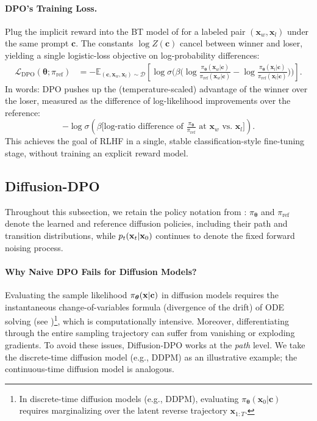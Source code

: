 \paragraph{DPO's Training Loss.}
Plug the implicit reward  into the BT model of  for a labeled pair $(\mathbf x_w,\mathbf x_l)$ under the same prompt $\mathbf c$. 
The constants $\log Z(\mathbf c)$ cancel between winner and loser, yielding a single logistic-loss objective on log-probability differences:
\begin{align*}
\mathcal L_{\mathrm{DPO}}(\bm\theta;\pi_{\mathrm{ref}})
&=
-\mathbb E_{(\mathbf c,\mathbf x_w,\mathbf x_l)\sim\mathcal D} \left[
\log \sigma \Big(
\beta\big(
\log\frac{\pi_{\bm\theta}(\mathbf x_w|\mathbf c)}{\pi_{\mathrm{ref}}(\mathbf x_w|\mathbf c)}
-
\log\frac{\pi_{\bm\theta}(\mathbf x_l|\mathbf c)}{\pi_{\mathrm{ref}}(\mathbf x_l|\mathbf c)}
\big)
\Big)
\right].
\end{align*}
In words: DPO pushes up the (temperature-scaled) advantage of the winner over the loser, measured as the difference of log-likelihood improvements over the reference:
\[
-\log \sigma \left(
  \beta 
  \bigl[
    \text{log-ratio difference of }
    \tfrac{\pi_{\bm\theta}}{\pi_{\mathrm{ref}}}
    \text{ at } \mathbf x_w \text{ vs.\ } \mathbf x_l
  \bigr]
\right).
\]
This achieves the goal of RLHF in a single, stable classification-style
fine-tuning stage, without training an explicit reward model.


\subsection{Diffusion-DPO}\label{subsec:diffusion-dpo}
Throughout this subsection, we retain the policy notation from
: $\pi_{\bm\theta}$ and $\pi_{\mathrm{ref}}$ denote the
learned and reference diffusion policies, including their path and transition
distributions, while $p_t({\mathbf{x}}_t|{\mathbf{x}}_0)$ continues to denote the fixed
forward noising process.
\paragraph{Why Naive DPO Fails for Diffusion Models?}
Evaluating the sample likelihood $\pi_{\bm{\theta}}(\mathbf x|\mathbf c)$ in diffusion models requires the instantaneous change-of-variables formula (divergence of the drift) of ODE solving (see )\footnote{In discrete-time diffusion models (e.g., DDPM), evaluating $\pi_{\bm\theta}(\mathbf x_0| \mathbf c)$ requires marginalizing over the latent reverse trajectory $\mathbf x_{1:T}$.
}, which is computationally intensive. Moreover, differentiating through the entire sampling trajectory can suffer from vanishing or exploding gradients. To avoid these issues, Diffusion-DPO works at the \emph{path} level. We take the discrete-time diffusion model (e.g., DDPM) as an illustrative example; the continuous-time diffusion model is analogous.

